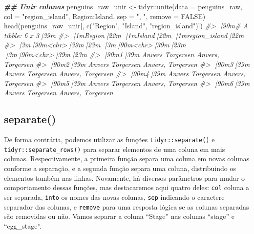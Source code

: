 \documentclass[
]{book}
\newenvironment{Shaded}{\begin{snugshade}}{\end{snugshade}}
\newcommand{\AttributeTok}[1]{\textcolor[rgb]{0.61,0.61,0.61}{#1}}
\newcommand{\CommentTok}[1]{\textcolor[rgb]{0.37,0.37,0.37}{\textit{#1}}}
\newcommand{\ConstantTok}[1]{\textcolor[rgb]{0,0,0}{#1}}
\newcommand{\DocumentationTok}[1]{\textcolor[rgb]{0.37,0.37,0.37}{\textbf{\textit{#1}}}}
\newcommand{\FunctionTok}[1]{\textcolor[rgb]{0,0,0}{#1}}
\newcommand{\NormalTok}[1]{#1}
\newcommand{\OtherTok}[1]{\textcolor[rgb]{0.37,0.37,0.37}{#1}}
\newcommand{\SpecialCharTok}[1]{\textcolor[rgb]{0,0,0}{#1}}
\newcommand{\StringTok}[1]{\textcolor[rgb]{0.5,0.5,0.5}{#1}}
\begin{document}
\begin{Shaded}
\begin{Highlighting}[]
\DocumentationTok{\#\# Unir colunas}
\NormalTok{penguins\_raw\_unir }\OtherTok{\textless{}{-}}\NormalTok{ tidyr}\SpecialCharTok{::}\FunctionTok{unite}\NormalTok{(}\AttributeTok{data =}\NormalTok{ penguins\_raw, }
                                  \AttributeTok{col =} \StringTok{"region\_island"}\NormalTok{,}
\NormalTok{                                  Region}\SpecialCharTok{:}\NormalTok{Island, }
                                  \AttributeTok{sep =} \StringTok{", "}\NormalTok{,}
                                  \AttributeTok{remove =} \ConstantTok{FALSE}\NormalTok{)}
\FunctionTok{head}\NormalTok{(penguins\_raw\_unir[, }\FunctionTok{c}\NormalTok{(}\StringTok{"Region"}\NormalTok{, }\StringTok{"Island"}\NormalTok{, }\StringTok{"region\_island"}\NormalTok{)])}
\CommentTok{\#\textgreater{} [90m\# A tibble: 6 x 3[39m}
\CommentTok{\#\textgreater{}   [1mRegion[22m [1mIsland[22m    [1mregion\_island[22m    }
\CommentTok{\#\textgreater{}   [3m[90m\textless{}chr\textgreater{}[39m[23m  [3m[90m\textless{}chr\textgreater{}[39m[23m     [3m[90m\textless{}chr\textgreater{}[39m[23m            }
\CommentTok{\#\textgreater{} [90m1[39m Anvers Torgersen Anvers, Torgersen}
\CommentTok{\#\textgreater{} [90m2[39m Anvers Torgersen Anvers, Torgersen}
\CommentTok{\#\textgreater{} [90m3[39m Anvers Torgersen Anvers, Torgersen}
\CommentTok{\#\textgreater{} [90m4[39m Anvers Torgersen Anvers, Torgersen}
\CommentTok{\#\textgreater{} [90m5[39m Anvers Torgersen Anvers, Torgersen}
\CommentTok{\#\textgreater{} [90m6[39m Anvers Torgersen Anvers, Torgersen}
\end{Highlighting}
\end{Shaded}

\hypertarget{separate}{%
\subsection{separate()}\label{separate}}

De forma contrária, podemos utilizar as funções \texttt{tidyr::separate()} e \texttt{tidyr::separate\_rows()} para separar elementos de uma coluna em mais colunas. Respectivamente, a primeira função separa uma coluna em novas colunas conforme a separação, e a segunda função separa uma coluna, distribuindo os elementos também nas linhas. Novamente, há diversos parâmetros para mudar o comportamento dessas funções, mas destacaremos aqui quatro deles: \texttt{col} coluna a ser separada, \texttt{into} os nomes das novas colunas, \texttt{sep} indicando o caractere separador das colunas, e \texttt{remove} para uma resposta lógica se as colunas separadas são removidas ou não. Vamos separar a coluna ``Stage'' nas colunas ``stage'' e ``egg\_stage''.
\end{document}
